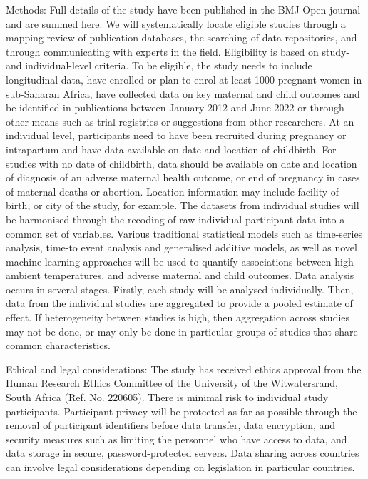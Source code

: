 \documentclass[12pt,letterpaper]{article}
\begin{document}
Methods: Full details of the study have been published in the BMJ Open journal  and are summed here. We will systematically locate eligible studies through a mapping review of publication databases, the searching of data repositories, and through communicating with experts in the field. Eligibility is based on study- and individual-level criteria. To be eligible, the study needs to include longitudinal data, have enrolled or plan to enrol at least 1000 pregnant women in sub-Saharan Africa, have collected data on key maternal and child outcomes and be identified in publications between January 2012 and June 2022 or through other means such as trial registries or suggestions from other researchers. At an individual level, participants need to have been recruited during pregnancy or intrapartum and have data available on date and location of childbirth. For studies with no date of childbirth, data should be available on date and location of diagnosis of an adverse maternal health outcome, or end of pregnancy in cases of maternal deaths or abortion. Location information may include facility of birth, or city of the study, for example. The datasets from individual studies will be harmonised through the recoding of raw individual participant data into a common set of variables. Various traditional statistical models such as time-series analysis, time-to event analysis and generalised additive models, as well as novel machine learning approaches will be used to quantify associations between high ambient temperatures, and adverse maternal and child outcomes. Data analysis occurs in several stages. Firstly, each study will be analysed individually. Then, data from the individual studies are aggregated to provide a pooled estimate of effect. If heterogeneity between studies is high, then aggregation across studies may not be done, or may only be done in particular groups of studies that share common characteristics.

Ethical and legal considerations: The study has received ethics approval from the Human Research Ethics Committee of the University of the Witwatersrand, South Africa (Ref. No. 220605). There is minimal risk to individual study participants. Participant privacy will be protected as far as possible through the removal of participant identifiers before data transfer, data encryption, and security measures such as limiting the personnel who have access to data, and data storage in secure, password-protected servers. Data sharing across countries can involve legal considerations depending on legislation in particular countries.
\end{document}
